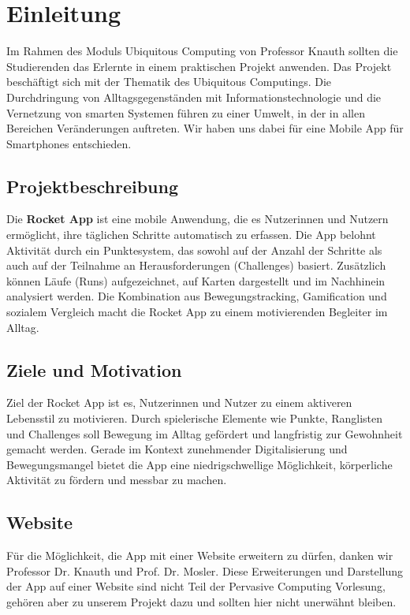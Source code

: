 \documentclass[11pt,a4paper]{article}
\begin{document}
\tableofcontents
\newpage

\section{Einleitung}
Im Rahmen des Moduls Ubiquitous Computing von Professor Knauth sollten die
Studierenden das Erlernte in einem praktischen Projekt anwenden.
Das Projekt beschäftigt sich mit der Thematik des Ubiquitous Computings. Die
Durchdringung von Alltagsgegenständen mit Informationstechnologie und die
Vernetzung von smarten Systemen führen zu einer Umwelt, in der in allen Bereichen
Veränderungen auftreten. Wir haben uns dabei für eine Mobile App für Smartphones entschieden.

\subsection{Projektbeschreibung}
Die \textbf{Rocket App} ist eine mobile Anwendung, die es Nutzerinnen und Nutzern ermöglicht, ihre täglichen Schritte automatisch zu erfassen. Die App belohnt Aktivität durch ein Punktesystem, das sowohl auf der Anzahl der Schritte als auch auf der Teilnahme an Herausforderungen (Challenges) basiert. Zusätzlich können Läufe (Runs) aufgezeichnet, auf Karten dargestellt und im Nachhinein analysiert werden. Die Kombination aus Bewegungstracking, Gamification und sozialem Vergleich macht die Rocket App zu einem motivierenden Begleiter im Alltag.

\subsection{Ziele und Motivation}
Ziel der Rocket App ist es, Nutzerinnen und Nutzer zu einem aktiveren Lebensstil zu motivieren. Durch spielerische Elemente wie Punkte, Ranglisten und Challenges soll Bewegung im Alltag gefördert und langfristig zur Gewohnheit gemacht werden. Gerade im Kontext zunehmender Digitalisierung und Bewegungsmangel bietet die App eine niedrigschwellige Möglichkeit, körperliche Aktivität zu fördern und messbar zu machen.

\subsection{Website}
Für die Möglichkeit, die App mit einer Website erweitern zu dürfen, danken wir Professor Dr. Knauth und Prof. Dr. Mosler.
Diese Erweiterungen und Darstellung der App auf einer Website sind nicht Teil der Pervasive Computing Vorlesung, gehören aber zu unserem Projekt dazu und sollten hier nicht unerwähnt bleiben.
\end{document}
